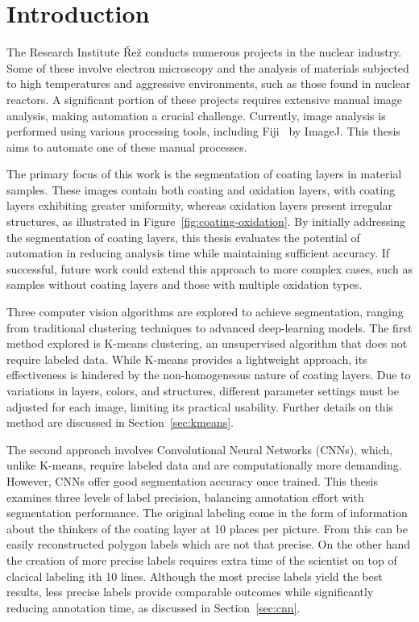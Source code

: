 \chapter{Introduction}

The Research Institute \v{R}e\v{z} conducts numerous projects in the nuclear industry. Some of these involve electron microscopy and the analysis of materials subjected to high temperatures and aggressive environments, such as those found in nuclear reactors. A significant portion of these projects requires extensive manual image analysis, making automation a crucial challenge. Currently, image analysis is performed using various processing tools, including Fiji~\cite{Schindelin2012} by ImageJ. This thesis aims to automate one of these manual processes.

The primary focus of this work is the segmentation of coating layers in material samples. These images contain both coating and oxidation layers, with coating layers exhibiting greater uniformity, whereas oxidation layers present irregular structures, as illustrated in Figure~\ref{fig:coating-oxidation}. By initially addressing the segmentation of coating layers, this thesis evaluates the potential of automation in reducing analysis time while maintaining sufficient accuracy. If successful, future work could extend this approach to more complex cases, such as samples without coating layers and those with multiple oxidation types.

Three computer vision algorithms are explored to achieve segmentation, ranging from traditional clustering techniques to advanced deep-learning models. The first method explored is K-means clustering, an unsupervised algorithm that does not require labeled data. While K-means provides a lightweight approach, its effectiveness is hindered by the non-homogeneous nature of coating layers. Due to variations in layers, colors, and structures, different parameter settings must be adjusted for each image, limiting its practical usability. Further details on this method are discussed in Section~\ref{sec:kmeans}.

The second approach involves Convolutional Neural Networks (CNNs), which, unlike K-means, require labeled data and are computationally more demanding. However, CNNs offer good segmentation accuracy once trained. This thesis examines three levels of label precision, balancing annotation effort with segmentation performance. The original labeling come in the form of information about the thinkers of the coating layer at 10 places per picture. From this can be easily reconstructed polygon labels which are not that precise. On the other hand the creation of more precise labels requires extra time of the scientist on top of clacical labeling ith 10 lines. Although the most precise labels yield the best results, less precise labels provide comparable outcomes while significantly reducing annotation time, as discussed in Section~\ref{sec:cnn}.

